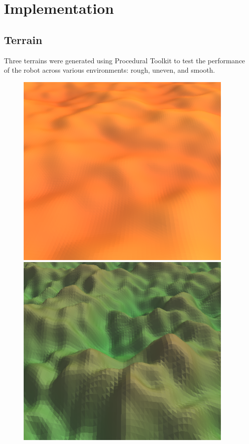 \documentclass{article}
\begin{document}
\newpage
\section{Implementation}
\label{sec:Implementation}
\subsection{Terrain}
\label{sec:Terrain Imp}
Three terrains were generated using Procedural Toolkit  to test the performance of the robot across various environments: rough, uneven, and smooth. 
\begin{figure}[H]
\centering
\includegraphics[scale=0.3]{smoothTerrain}
\includegraphics[scale=0.3]{unevenTerrain}

\end{figure}
\end{document}
